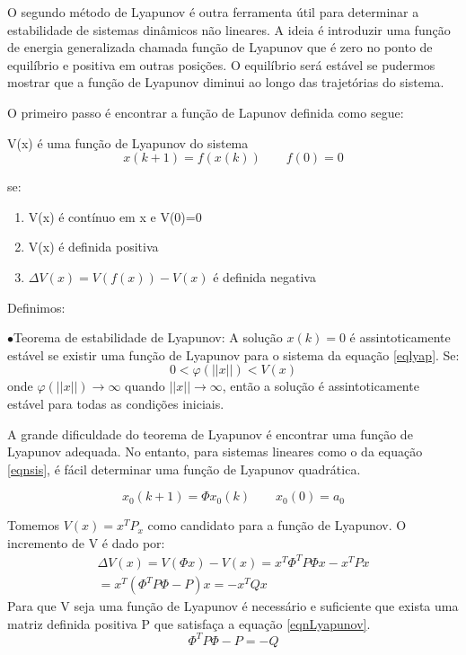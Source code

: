 O segundo método de Lyapunov é outra ferramenta útil para determinar a estabilidade de sistemas dinâmicos não lineares. A ideia é introduzir uma função de energia generalizada chamada função de Lyapunov que é zero no ponto de equilíbrio e positiva em outras posições. O equilíbrio será estável se pudermos mostrar que a função de Lyapunov diminui ao longo das trajetórias do sistema.


O primeiro passo é encontrar a função de Lapunov definida como segue:


V(x) é uma função de Lyapunov do sistema
\begin{equation}\label{eqlyap}
x(k+1)=f(x(k)) \qquad f(0)=0
\end{equation}

se:
\begin{enumerate}
	\item V(x) é contínuo em x e V(0)=0
	\item V(x) é definida positiva
	\item $\Delta V(x)=V(f(x))-V(x)$ é definida negativa
\end{enumerate}

Definimos:


$\bullet$Teorema de estabilidade de Lyapunov: A solução $x(k)=0$ é assintoticamente estável se existir uma função de Lyapunov para o sistema da equação \ref{eqlyap}. Se:
\begin{equation}
0<\varphi(||x||)<V(x)
\end{equation}
onde $\varphi(||x||)\to \infty$ quando $||x|| \to \infty$, então a solução é assintoticamente estável para todas as condições iniciais.


A grande dificuldade do teorema de Lyapunov é encontrar uma função de Lyapunov adequada. No entanto, para sistemas lineares como o da equação \ref{eqnsis}, é fácil determinar uma função de Lyapunov quadrática.

\begin{equation} \label{eqnsis}
x_0(k+1)=\Phi x_0(k) \qquad x_0(0)=a_0
\end{equation}

Tomemos $V(x)=x^TP_x$ como candidato para a função de Lyapunov. O incremento de V é dado por:
\begin{equation}
\begin{array}{c}
\Delta V(x)=V(\Phi x)-V(x)=x^T\Phi ^T P \Phi x-x^TPx\\
=x^T(\Phi ^T P \Phi -P)x=-x^TQx
\end{array}
\end{equation}
Para que V seja uma função de Lyapunov é necessário e suficiente que exista uma matriz definida positiva P que satisfaça a equação \ref{eqnLyapunov}.
\begin{equation}\label{eqnLyapunov}
\Phi ^T P \Phi - P= -Q
\end{equation}






